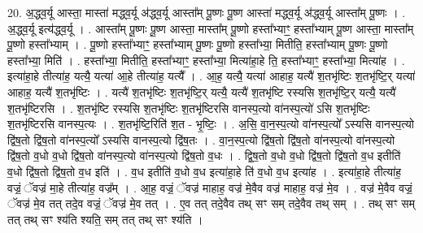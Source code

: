 \documentclass[17pt]{extarticle}
\begin{document}
20. अ॒द्ध्व॒र्यू आस्ता॒ मास्ता॑ मद्ध्व॒र्यू अ॑द्ध्व॒र्यू आस्ता᳚म् पू॒ष्णः पू॒ष्ण आस्ता॑ मद्ध्व॒र्यू अ॑द्ध्व॒र्यू आस्ता᳚म् पू॒ष्णः । . अ॒द्ध्व॒र्यू इत्य॑द्ध्व॒र्यू । . आस्ता᳚म् पू॒ष्णः पू॒ष्ण आस्ता॒ मास्ता᳚म् पू॒ष्णो हस्ता᳚भ्याꣳ॒॒ हस्ता᳚भ्याम् पू॒ष्ण आस्ता॒ मास्ता᳚म् पू॒ष्णो हस्ता᳚भ्याम् । . पू॒ष्णो हस्ता᳚भ्याꣳ॒॒ हस्ता᳚भ्याम् पू॒ष्णः पू॒ष्णो हस्ता᳚भ्या॒ मितीति॒ हस्ता᳚भ्याम् पू॒ष्णः पू॒ष्णो हस्ता᳚भ्या॒ मिति॑ । . हस्ता᳚भ्या॒ मितीति॒ हस्ता᳚भ्याꣳ॒॒ हस्ता᳚भ्या॒ मित्या॑हा॒हे ति॒ हस्ता᳚भ्याꣳ॒॒ हस्ता᳚भ्या॒ मित्या॑ह । . इत्या॑हा॒हे तीत्या॑ह॒ यत्यै॒ यत्या॑ आ॒हे तीत्या॑ह॒ यत्यै᳚ । . आ॒ह॒ यत्यै॒ यत्या॑ आहाह॒ यत्यै॑ श॒तभृ॑ष्टिः श॒तभृ॑ष्टि॒र् यत्या॑ आहाह॒ यत्यै॑ श॒तभृ॑ष्टिः । . यत्यै॑ श॒तभृ॑ष्टिः श॒तभृ॑ष्टि॒र् यत्यै॒ यत्यै॑ श॒तभृ॑ष्टि रस्यसि श॒तभृ॑ष्टि॒र् यत्यै॒ यत्यै॑ श॒तभृ॑ष्टिरसि । . श॒तभृ॑ष्टि रस्यसि श॒तभृ॑ष्टिः श॒तभृ॑ष्टिरसि वानस्प॒त्यो वा॑नस्प॒त्यो॑ ऽसि श॒तभृ॑ष्टिः श॒तभृ॑ष्टिरसि वानस्प॒त्यः । . श॒तभृ॑ष्टि॒रिति॑ श॒त - भृ॒ष्टिः॒ । . अ॒सि॒ वा॒न॒स्प॒त्यो वा॑नस्प॒त्यो᳚ ऽस्यसि वानस्प॒त्यो द्वि॑ष॒तो द्वि॑ष॒तो वा॑नस्प॒त्यो᳚ ऽस्यसि वानस्प॒त्यो द्वि॑ष॒तः । . वा॒न॒स्प॒त्यो द्वि॑ष॒तो द्वि॑ष॒तो वा॑नस्प॒त्यो वा॑नस्प॒त्यो द्वि॑ष॒तो व॒धो व॒धो द्वि॑ष॒तो वा॑नस्प॒त्यो वा॑नस्प॒त्यो द्वि॑ष॒तो व॒धः । . द्वि॒ष॒तो व॒धो व॒धो द्वि॑ष॒तो द्वि॑ष॒तो व॒ध इतीति॑ व॒धो द्वि॑ष॒तो द्वि॑ष॒तो व॒ध इति॑ । . व॒ध इतीति॑ व॒धो व॒ध इत्या॑हा॒हे ति॑ व॒धो व॒ध इत्या॑ह । . इत्या॑हा॒हे तीत्या॑ह॒ वज्रं॒ ॅवज्र॑ मा॒हे तीत्या॑ह॒ वज्र᳚म् । . आ॒ह॒ वज्रं॒ ॅवज्र॑ माहाह॒ वज्र॑ मे॒वैव वज्र॑ माहाह॒ वज्र॑ मे॒व । . वज्र॑ मे॒वैव वज्रं॒ ॅवज्र॑ मे॒व तत् तदे॒व वज्रं॒ ॅवज्र॑ मे॒व तत् । . ए॒व तत् तदे॒वैव तथ् सꣳ सम् तदे॒वैव तथ् सम् । . तथ् सꣳ सम् तत् तथ् सꣳ श्य॑ति श्यति॒ सम् तत् तथ् सꣳ श्य॑ति । \newline
\end{document}
